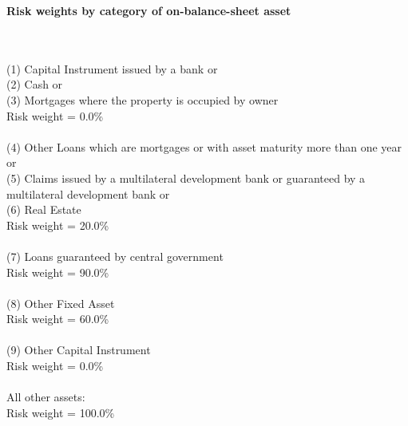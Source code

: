 \documentclass{article}
\begin{document}
\setlength{\parindent}{0em}
\begin{center}{\bf Risk weights by category of on-balance-sheet asset}\end{center}
~\\
~\\

(1) Capital Instrument issued by a bank or \\
(2) Cash or \\
(3) Mortgages where the property is occupied by owner \\
Risk weight = 0.0\%\\

~\\
(4) Other Loans which are mortgages or with asset maturity more than one year or \\
(5) Claims issued by a multilateral development bank or guaranteed by a multilateral development bank or \\
(6) Real Estate\\
Risk weight = 20.0\%\\

~\\
(7) Loans guaranteed by central government \\
Risk weight = 90.0\%\\

~\\
(8) Other Fixed Asset\\
Risk weight = 60.0\%\\

~\\
(9) Other Capital Instrument\\
Risk weight = 0.0\%\\

~\\
All other assets:\\
Risk weight = 100.0\%\\

~\\
\end{document}

